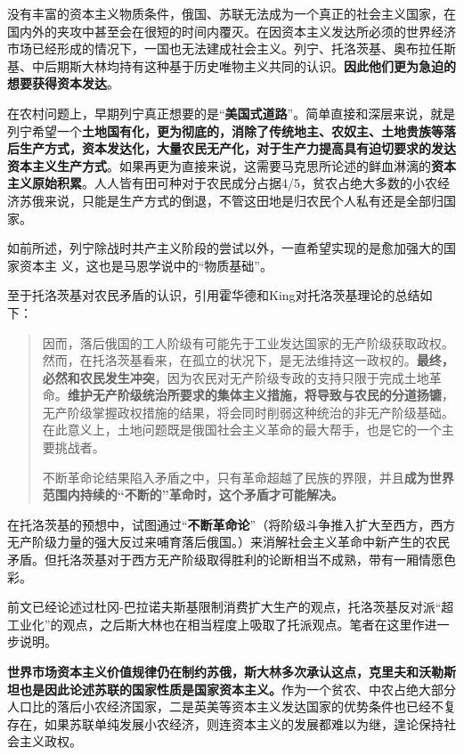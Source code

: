 没有丰富的资本主义物质条件，俄国、苏联无法成为一个真正的社会主义国家，在国内外的夹攻中甚至会在很短的时间内覆灭。在因资本主义发达所必须的世界经济市场已经形成的情况下，一国也无法建成社会主义。列宁、托洛茨基、奥布拉任斯基、中后期斯大林均持有这种基于历史唯物主义共同的认识。\textbf{因此他们更为急迫的想要获得资本发达}。

在农村问题上，早期列宁真正想要的是“\textbf{美国式道路}”\cite{chenxintianamerica}。简单直接和深层来说，就是列宁希望一个\textbf{土地国有化，更为彻底的，消除了传统地主、农奴主、土地贵族等落后生产方式，资本发达化，大量农民无产化，对于生产力提高具有迫切要求的发达资本主义生产方式}。如果再更为直接来说，这需要马克思所论述的鲜血淋漓的\textbf{资本主义原始积累}。人人皆有田可种对于农民成分占据4/5，贫农占绝大多数的小农经济苏俄来说，只能是生产方式的倒退，不管这田地是归农民个人私有还是全部归国家。

如前所述，列宁除战时共产主义阶段的尝试以外，一直希望实现的是愈加强大的国家资本主
义，这也是马恩学说中的“物质基础”。

至于托洛茨基对农民矛盾的认识，引用霍华德和King对托洛茨基理论的总结如下：
\begin{quotation}因而，落后俄国的工人阶级有可能先于工业发达国家的无产阶级获取政权。然而，在托洛茨基看来，在孤立的状况下，是无法维持这一政权的。\textbf{最终，必然和农民发生冲突}，因为农民对无产阶级专政的支持只限于完成土地革命。\textbf{维护无产阶级统治所要求的集体主义措施，将导致与农民的分道扬镳}，无产阶级掌握政权措施的结果，将会同时削弱这种统治的非无产阶级基础。在此意义上，土地问题既是俄国社会主义革命的最大帮手，也是它的一个主要挑战者。

  不断革命论结果陷入矛盾之中，只有革命超越了民族的界限，并且\textbf{成为世界范围内持续的“不断的”革命时，这个矛盾才可能解决。}
\end{quotation}在托洛茨基的预想中，试图通过“\textbf{不断革命论}”（将阶级斗争推入扩大至西方，西方无产阶级力量的强大反过来哺育落后俄国。）来消解社会主义革命中新产生的农民矛盾。但托洛茨基对于西方无产阶级取得胜利的论断相当不成熟，带有一厢情愿色彩。

前文已经论述过杜冈-巴拉诺夫斯基限制消费扩大生产的观点，托洛茨基反对派“超工业化”的观点，之后斯大林也在相当程度上吸取了托派观点。笔者在这里作进一步说明。

\textbf{世界市场资本主义价值规律仍在制约苏俄，斯大林多次承认这点，克里夫和沃勒斯坦也是因此论述苏联的国家性质是国家资本主义。}作为一个贫农、中农占绝大部分人口比的落后小农经济国家，二是英美等资本主义发达国家的优势条件也已经不复存在，如果苏联单纯发展小农经济，则连资本主义的发展都难以为继，遑论保持社会主义政权。

